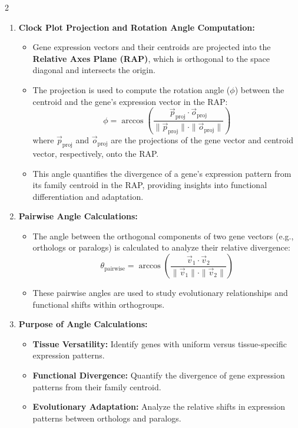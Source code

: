 2\documentclass{article}
\begin{document}
\begin{enumerate}
    \item \textbf{Clock Plot Projection and Rotation Angle Computation:}
    \begin{itemize}
        \item Gene expression vectors and their centroids are projected into the \textbf{Relative Axes Plane (RAP)}, which is orthogonal to the space diagonal and intersects the origin.
        \item The projection is used to compute the rotation angle (\( \phi \)) between the centroid and the gene's expression vector in the RAP:
        \[
        \phi = \arccos\left(\frac{\vec{p}_{\text{proj}} \cdot \vec{o}_{\text{proj}}}{\|\vec{p}_{\text{proj}}\| \cdot \|\vec{o}_{\text{proj}}\|}\right)
        \]
        where \( \vec{p}_{\text{proj}} \) and \( \vec{o}_{\text{proj}} \) are the projections of the gene vector and centroid vector, respectively, onto the RAP.
        \item This angle quantifies the divergence of a gene's expression pattern from its family centroid in the RAP, providing insights into functional differentiation and adaptation.
    \end{itemize}

    \item \textbf{Pairwise Angle Calculations:}
    \begin{itemize}
        \item The angle between the orthogonal components of two gene vectors (e.g., orthologs or paralogs) is calculated to analyze their relative divergence:
        \[
        \theta_{\text{pairwise}} = \arccos\left(\frac{\vec{v}_1 \cdot \vec{v}_2}{\|\vec{v}_1\| \cdot \|\vec{v}_2\|}\right)
        \]
        \item These pairwise angles are used to study evolutionary relationships and functional shifts within orthogroups.
    \end{itemize}

    \item \textbf{Purpose of Angle Calculations:}
    \begin{itemize}
        \item \textbf{Tissue Versatility:} Identify genes with uniform versus tissue-specific expression patterns.
        \item \textbf{Functional Divergence:} Quantify the divergence of gene expression patterns from their family centroid.
        \item \textbf{Evolutionary Adaptation:} Analyze the relative shifts in expression patterns between orthologs and paralogs.
    \end{itemize}
\end{enumerate}
\end{document}
